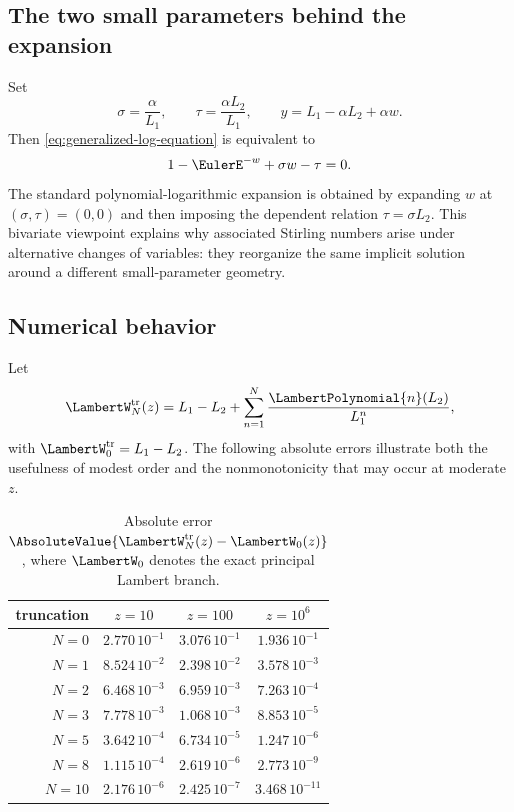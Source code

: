 \documentclass[11pt]{article}
\theoremstyle{pltheorem}
\newcommand{\LambertWTruncation}[1]{\LambertW^{\mathrm{tr}}_{#1}}
\begin{document}
\subsection{The two small parameters behind the expansion}

Set
\begin{equation}\label{eq:sigma-tau}
 \sigma=\frac{\alpha}{L_1},
 \qquad
 \tau=\frac{\alpha L_2}{L_1},
 \qquad
 y=L_1-\alpha L_2+\alpha w.
\end{equation}
Then \cref{eq:generalized-log-equation} is equivalent to
\begin{equation}\label{eq:w-sigma-tau}
 1-\EulerE^{-w}+\sigma w-\tau=0.
\end{equation}
The standard polynomial-logarithmic expansion is obtained by expanding \(w\) at
\((\sigma,\tau)=(0,0)\) and then imposing the dependent relation
\(\tau=\sigma L_2\).  This bivariate viewpoint explains why associated Stirling numbers arise under alternative changes of variables: they reorganize the same implicit solution around a different small-parameter geometry.

\subsection{Numerical behavior}

Let
\begin{equation}\label{eq:WN-def}
 \LambertWTruncation{N}(z)=L_1-L_2+\sum_{n=1}^{N}\frac{\LambertPolynomial{n}(L_2)}{L_1^n},
\end{equation}
with \(\LambertWTruncation{0}=L_1-L_2\).  The following absolute errors illustrate both the usefulness of modest order and the nonmonotonicity that may occur at moderate \(z\).

\begin{table}[htbp]
\centering
\small
\caption{Absolute error \(\AbsoluteValue{\LambertWTruncation{N}(z)-\LambertW_0(z)}\), where \(\LambertW_0\) denotes the exact principal Lambert branch.}
\label{tab:W-errors}
\begin{tabular}{@{}rccc@{}}
\toprule
truncation & \(z=10\) & \(z=100\) & \(z=10^6\)\\
\midrule
\(N=0\)  & \(2.770\,10^{-1}\) & \(3.076\,10^{-1}\) & \(1.936\,10^{-1}\)\\
\(N=1\)  & \(8.524\,10^{-2}\) & \(2.398\,10^{-2}\) & \(3.578\,10^{-3}\)\\
\(N=2\)  & \(6.468\,10^{-3}\) & \(6.959\,10^{-3}\) & \(7.263\,10^{-4}\)\\
\(N=3\)  & \(7.778\,10^{-3}\) & \(1.068\,10^{-3}\) & \(8.853\,10^{-5}\)\\
\(N=5\)  & \(3.642\,10^{-4}\) & \(6.734\,10^{-5}\) & \(1.247\,10^{-6}\)\\
\(N=8\)  & \(1.115\,10^{-4}\) & \(2.619\,10^{-6}\) & \(2.773\,10^{-9}\)\\
\(N=10\) & \(2.176\,10^{-6}\) & \(2.425\,10^{-7}\) & \(3.468\,10^{-11}\)\\
\bottomrule
\end{tabular}
\end{table}
\end{document}
